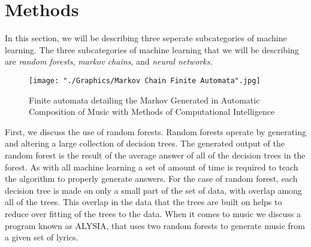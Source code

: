 \documentclass{sig-alternate}
\begin{document}
\section{Methods}
\label{sec:methods}

	In this section, we will be describing three seperate subcategories of machine learning. The three subcategories of machine learning that we will be describing are \textit{random forests},\textit{ markov chains}, and \textit{neural networks}. 

\begin{figure}[H]
	\texttt{[image: "./Graphics/Markov Chain Finite Automata".jpg]}
	\caption{Finite automata detailing the Markov Generated in Automatic Composition of Music with Methods of Computational Intelligence}
	\label{fig:markovchain1}
\end{figure}
	First, we discuss the use of random forests. Random forests operate by generating and altering a large collection of decision trees. The generated output of the random forest is the result of the average answer of all of the decision trees in the forest. As with all machine learning a set of amount of time is required to teach the algorithm to properly generate answers. For the case of random forest, each decision tree is made on only a small part of the set of data, with overlap among all of the trees. This overlap in the data that the trees are built on helps to reduce over fitting of the trees to the data. When it comes to music we discuss a program known as ALYSIA, that uses two random forests to generate music from a given set of lyrics.
	
\end{document}
